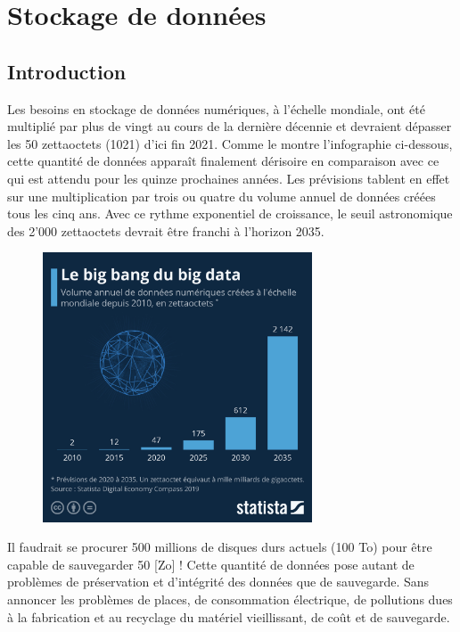 \documentclass[11pt, a4paper]{book}
\begin{document}
\setcounter{chapter}{3}


\chapter{Stockage de données}
\section{Introduction}

Les besoins en stockage de données numériques, à l’échelle mondiale, ont été multiplié par plus de vingt au cours de la dernière décennie et devraient dépasser les 50 zettaoctets (1021) d’ici fin 2021. Comme le montre l’infographie ci-dessous, cette quantité de données apparaît finalement dérisoire en comparaison avec ce qui est attendu pour les quinze prochaines années. Les prévisions tablent en effet sur une multiplication par trois ou quatre du volume annuel de données créées tous les cinq ans. Avec ce rythme exponentiel de croissance, le seuil astronomique des 2’000 zettaoctets devrait être franchi à l’horizon 2035.

\begin{figure}[ht!]
\centering
\includegraphics[width=8cm]{images/statista.jpeg}
\end{figure}

Il faudrait se procurer 500 millions de disques durs actuels (100 To) pour être capable de sauvegarder 50 [Zo] ! Cette quantité de données pose autant de problèmes de préservation et d’intégrité des données que de sauvegarde. Sans annoncer les problèmes de places, de consommation électrique, de pollutions dues à la fabrication et au recyclage du matériel vieillissant, de coût et de sauvegarde.
\end{document}
